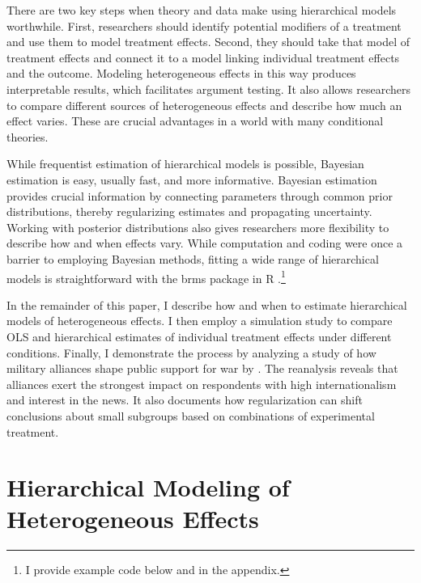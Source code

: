 \documentclass[12pt]{article}
\begin{document}
There are two key steps when theory and data make using hierarchical models worthwhile.
First, researchers should identify potential modifiers of a treatment and use them to model treatment effects.
Second, they should take that model of treatment effects and connect it to a model linking individual treatment effects and the outcome.
Modeling heterogeneous effects in this way produces interpretable results, which facilitates argument testing.
It also allows researchers to compare different sources of heterogeneous effects and describe how much an effect varies.  
These are crucial advantages in a world with many conditional theories.


While frequentist estimation of hierarchical models is possible, Bayesian estimation is easy, usually fast, and more informative.
Bayesian estimation provides crucial information by connecting parameters through common prior distributions, thereby regularizing estimates and propagating uncertainty. 
Working with posterior distributions also gives researchers more flexibility to describe how and when effects vary. 
While computation and coding were once a barrier to employing Bayesian methods, fitting a wide range of hierarchical models is straightforward with the brms package in \textsf{R} \citep{Buerkner2017}.\footnote{I provide example code below and in the appendix.}



In the remainder of this paper, I describe how and when to estimate hierarchical models of heterogeneous effects.
I then employ a simulation study to compare OLS and hierarchical estimates of individual treatment effects under different conditions.
Finally, I demonstrate the process by analyzing a study of how military alliances shape public support for war by \citet{TomzWeeks2021}. 
The reanalysis reveals that alliances exert the strongest impact on respondents with high internationalism and interest in the news. 
It also documents how regularization can shift conclusions about small subgroups based on combinations of experimental treatment.



\section{Hierarchical Modeling of Heterogeneous Effects}
\end{document}
